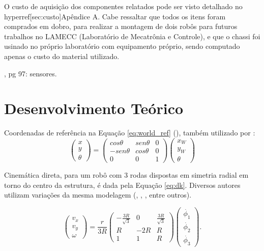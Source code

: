 O custo de aquisição dos componentes relatados pode ser visto detalhado no hyperref[sec:custo]{Apêndice A}. Cabe ressaltar que todos os itens foram comprados em dobro, para realizar a montagem de dois robôs para futuros trabalhos no LAMECC (Laboratório de Mecatrônia e Controle), e que o chassi foi usinado no próprio laboratório com equipamento próprio, sendo computado apenas o custo do material utilizado.


\cite{siegwart2011introduction}, pg 97: sensores.

\section{Desenvolvimento Teórico}
\label{sec:teorico}


Coordenadas de referência na Equação \ref{eq:world_ref} (\cite{siegwart2011introduction}), também utilizado por \cite{ritter2016modelagem}:
\begin{equation}
  \begin{pmatrix}
    x \\
    y \\
    \theta
  \end{pmatrix}
  =
  \begin{pmatrix}
    cos \theta & sen \theta & 0 \\
    -sen\theta & cos \theta & 0 \\
    0          & 0          & 1
  \end{pmatrix}
  \begin{pmatrix}
    x_W \\
    y_W \\
    \theta
  \end{pmatrix}
  \label{eq:world_ref}
\end{equation}

Cinemática direta, para um robô com 3 rodas dispostas em simetria radial em torno do centro da estrutura, é dada pela Equação \ref{eq:dk}. Diversos autores utilizam variações da mesma modelagem (\cite{rojas2006holonomic}, \cite{ritter2016modelagem}, \cite{pin1994new}, entre outros).

\begin{equation}
  \begin{pmatrix}
    v_x \\
    v_y \\
    \omega
  \end{pmatrix}
  =
  \frac{r}{3R}
  \begin{pmatrix}
    -\frac{3R}{\sqrt{3}} & 0   & \frac{3R}{\sqrt{3}} \\
    R                    & -2R & R                   \\
    1                    & 1   & R
  \end{pmatrix}
  \begin{pmatrix}
    \dot{\phi_1} \\
    \dot{\phi_2} \\
    \dot{\phi_3}
  \end{pmatrix}.
  \label{eq:dk}
\end{equation}

